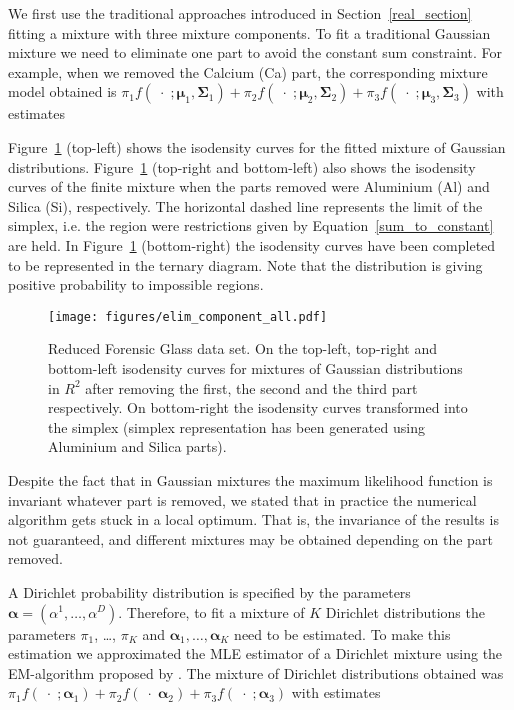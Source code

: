 \documentclass[12pt, a4paper]{article}
\newcommand{\m}[1]{\boldsymbol{#1}}
\begin{document}
We first use the traditional approaches introduced in Section~\ref{real_section} fitting a mixture with three mixture components. To fit a traditional Gaussian mixture we need to eliminate one part to avoid the constant sum constraint. For example, when we removed the Calcium (Ca) part, the corresponding mixture model obtained is
$
\pi_1 f(\;\cdot\; ; \m\mu_1, \m\Sigma_1) + \pi_2 f(\;\cdot\; ; \m\mu_2, \m\Sigma_2) + \pi_3 f(\;\cdot\; ; \m\mu_3, \m\Sigma_3)
$
with estimates

{\small  }


Figure~\ref{fig05component_elimination} (top-left) shows the isodensity curves for the fitted mixture of Gaussian distributions. Figure~\ref{fig05component_elimination} (top-right and bottom-left) also shows the isodensity curves of the finite mixture when the parts removed were Aluminium (Al) and Silica (Si), respectively. The horizontal dashed line represents the limit of the simplex, i.e. the region were restrictions given by Equation~\ref{sum_to_constant} are held. In Figure~\ref{fig05component_elimination} (bottom-right) the isodensity curves have been completed to be represented in the ternary diagram. Note that the distribution is giving positive probability to impossible regions. 

\begin{figure}[htbp]
\texttt{[image: figures/elim\_component\_all.pdf]}
\caption{Reduced Forensic Glass data set. On the top-left, top-right and bottom-left isodensity curves for mixtures of Gaussian distributions in $R^{2}$ after removing the first, the second and the third part respectively. On bottom-right the isodensity curves transformed into the simplex (simplex representation has been generated using Aluminium and Silica parts).}
\label{fig05component_elimination}
\end{figure}

Despite the fact that in Gaussian mixtures the maximum likelihood function is invariant whatever part is removed, we stated that in practice the numerical algorithm gets stuck in a local optimum. That is, the invariance of the results is not guaranteed, and different mixtures may be obtained depending on the part removed. 

A Dirichlet probability distribution is specified by the parameters $\m\alpha=\left( \alpha^1, \dots ,\alpha^D \right)$. Therefore, to fit a mixture of $K$ Dirichlet distributions the parameters $\pi_1$, \dots, $\pi_K$ and $\m\alpha_1, \dots, \m\alpha_K$ need to be estimated. To make this estimation we approximated the MLE estimator of a Dirichlet mixture using the EM-algorithm proposed by \cite{celeux1992classification}. The mixture of Dirichlet distributions obtained was $
\pi_1 f(\;\cdot\; ; \m\alpha_1) + \pi_2 f(\;\cdot\; \m\alpha_2) + \pi_3 f(\;\cdot\; ; \m\alpha_3)
$
 with estimates
{\small  }
\end{document}
